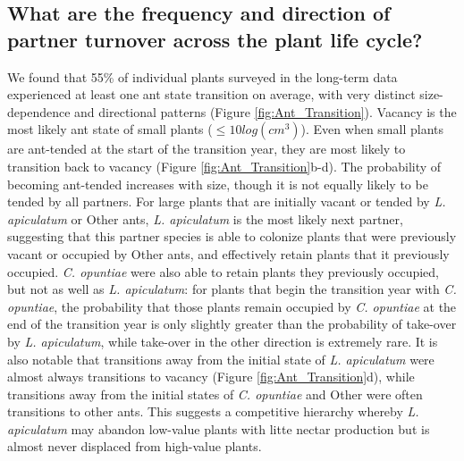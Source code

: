 \documentclass[11pt]{article}
\begin{document}
\subsection*{What are the frequency and direction of partner turnover across the plant life cycle?}
We found that 55\% of individual plants surveyed in the long-term data experienced at least one ant state transition on average, with very distinct size-dependence and directional patterns (Figure \ref{fig:Ant_Transition}). 
Vacancy is the most likely ant state of small plants ($\leq 10 log(cm^3)$).
Even when small plants are ant-tended at the start of the transition year, they are most likely to transition back to vacancy (Figure \ref{fig:Ant_Transition}b-d). 
The probability of becoming ant-tended increases with size, though it is not equally likely to be tended by all partners. 
For large plants that are initially vacant or tended by \textit{L. apiculatum} or Other ants, \textit{L. apiculatum} is the most likely next partner, suggesting that this partner species is able to colonize plants that were previously vacant or occupied by Other ants, and effectively retain plants that it previously occupied.  
\textit{C. opuntiae} were also able to retain plants they previously occupied, but not as well as \textit{L. apiculatum}: for plants that begin the transition year with \textit{C. opuntiae}, the probability that those plants remain occupied by \textit{C. opuntiae} at the end of the transition year is only slightly greater than the probability of take-over by \textit{L. apiculatum}, while take-over in the other direction is extremely rare. 
It is also notable that transitions away from the initial state of  \textit{L. apiculatum} were almost always transitions to vacancy (Figure \ref{fig:Ant_Transition}d), while transitions away from the initial states of \textit{C. opuntiae} and Other  were often transitions to other ants. 
This suggests a competitive hierarchy whereby \textit{L. apiculatum} may abandon low-value plants with litte nectar production but is almost never displaced from high-value plants. 
\end{document}
